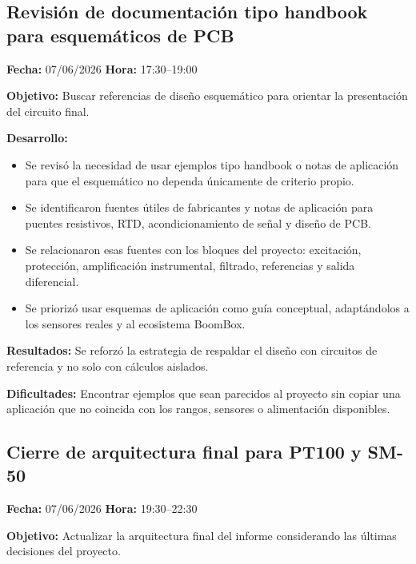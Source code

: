 \documentclass[12pt]{article}
\begin{document}
\subsection{Revisión de documentación tipo handbook para esquemáticos de PCB}
\textbf{Fecha:} 07/06/2026 \quad \textbf{Hora:} 17:30--19:00

\textbf{Objetivo:}
Buscar referencias de diseño esquemático para orientar la presentación del circuito final.

\textbf{Desarrollo:}
\begin{itemize}
\item Se revisó la necesidad de usar ejemplos tipo handbook o notas de aplicación para que el esquemático no dependa únicamente de criterio propio.
\item Se identificaron fuentes útiles de fabricantes y notas de aplicación para puentes resistivos, RTD, acondicionamiento de señal y diseño de PCB.
\item Se relacionaron esas fuentes con los bloques del proyecto: excitación, protección, amplificación instrumental, filtrado, referencias y salida diferencial.
\item Se priorizó usar esquemas de aplicación como guía conceptual, adaptándolos a los sensores reales y al ecosistema BoomBox.
\end{itemize}

\textbf{Resultados:}
Se reforzó la estrategia de respaldar el diseño con circuitos de referencia y no solo con cálculos aislados.

\textbf{Dificultades:}
Encontrar ejemplos que sean parecidos al proyecto sin copiar una aplicación que no coincida con los rangos, sensores o alimentación disponibles.

\subsection{Cierre de arquitectura final para PT100 y SM-50}
\textbf{Fecha:} 07/06/2026 \quad \textbf{Hora:} 19:30--22:30

\textbf{Objetivo:}
Actualizar la arquitectura final del informe considerando las últimas decisiones del proyecto.
\end{document}
